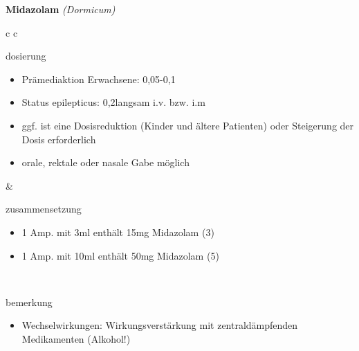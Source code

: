 \begin{frame}{
    \textbf{Midazolam}
    \textit{(Dormicum)}
}
    \begin{tabular}{c c}
        \begin{beamercolorbox}[wd=\boxwidth\textwidth,ht=\boxheight\textheight,sep=1em]{dosierung}
            \scriptsize
            \begin{itemize}
                \item Prämediaktion Erwachsene: 0,05-0,1\mgkgkg
                \item Status epilepticus: 0,2\mgkgkg langsam i.v. bzw. i.m
                \item ggf. ist eine Dosisreduktion (Kinder und ältere Patienten) oder Steigerung der Dosis erforderlich
                \item orale, rektale oder nasale Gabe möglich
            \end{itemize}
        \end{beamercolorbox} & 
        \begin{beamercolorbox}[wd=\boxwidth\textwidth,ht=\boxheight\textheight,sep=1em]{zusammensetzung}
            \begin{itemize}
                \item 1 Amp. mit 3ml enthält 15mg Midazolam (3\mgml)
                \item 1 Amp. mit 10ml enthält 50mg Midazolam (5\mgml)
            \end{itemize}
        \end{beamercolorbox} \\
        \begin{beamercolorbox}[wd=\textwidth,ht=\boxheight\textheight,sep=1em]{bemerkung}
            \begin{itemize}
                \item Wechselwirkungen: Wirkungsverstärkung mit zentraldämpfenden Medikamenten (Alkohol!)
            \end{itemize}
        \end{beamercolorbox} \\
    \end{tabular}
\end{frame}


